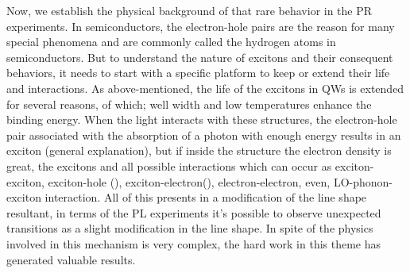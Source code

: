 Now, we establish the physical background of that rare behavior in the PR experiments. In semiconductors, the electron-hole pairs are the reason for many special phenomena and are commonly called the hydrogen atoms in semiconductors. But to understand the nature of excitons and their consequent behaviors, it needs to start with a specific platform to keep or extend their life and interactions.  As above-mentioned, the life of the excitons in QWs is extended for several reasons, of which; well width and low temperatures enhance the binding energy\cite{bastard1982exciton,shinozuka1983wannier}. When the light interacts with these structures, the electron-hole pair associated with the absorption of a photon with enough energy results in an exciton (general explanation), but if inside the structure the electron density is great\cite{kheng1993observation}, the excitons and all possible interactions which can occur as exciton-exciton, exciton-hole (\xm), exciton-electron(\xp), electron-electron, even, LO-phonon-exciton interaction. 
All of this presents in a modification of the line shape resultant, in terms of the PL experiments it's possible to observe unexpected transitions as a slight modification in the line shape. In spite of the physics involved in this mechanism is very complex, the hard work in this theme has generated valuable results. 

